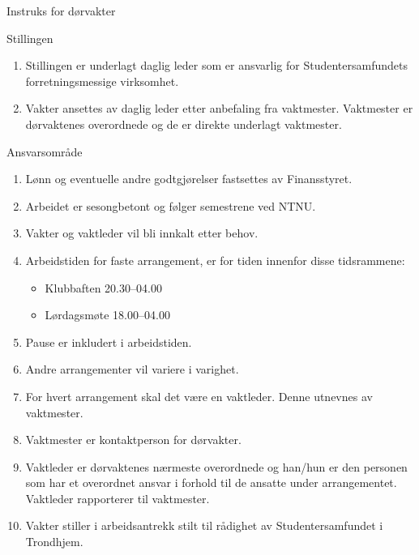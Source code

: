 \begin{instruks*}{Instruks for dørvakter}
    \begin{instruksledd}{Stillingen}
        \begin{enumerate}
            \item Stillingen er underlagt daglig leder som er ansvarlig for Studentersamfundets forretningsmessige virksomhet.
            \item Vakter ansettes av daglig leder etter anbefaling fra vaktmester. Vaktmester er dørvaktenes 
                overordnede og de er direkte underlagt vaktmester.
        \end{enumerate}    
    \end{instruksledd}

    \begin{instruksledd}{Ansvarsområde}
        \begin{enumerate}
            \item Lønn og eventuelle andre godtgjørelser fastsettes av Finansstyret.
            \item Arbeidet er sesongbetont og følger semestrene ved NTNU.
            \item Vakter og vaktleder vil bli innkalt etter behov.
            \item Arbeidstiden for faste arrangement, er for tiden innenfor disse tidsrammene:
                \begin{itemize}
                    \item Klubbaften 20.30--04.00
                    \item Lørdagsmøte 18.00--04.00
                \end{itemize}
            \item Pause er inkludert i arbeidstiden.
            \item Andre arrangementer vil variere i varighet.
            \item For hvert arrangement skal det være en vaktleder. Denne utnevnes av vaktmester.
            \item Vaktmester er kontaktperson for dørvakter.
            \item Vaktleder er dørvaktenes nærmeste overordnede og han/hun er den personen som har et overordnet ansvar i
                forhold til de ansatte under arrangementet. Vaktleder rapporterer til vaktmester.
            \item Vakter stiller i arbeidsantrekk stilt til rådighet av Studentersamfundet i Trondhjem.
        \end{enumerate}    
    \end{instruksledd}


\end{instruks*}
